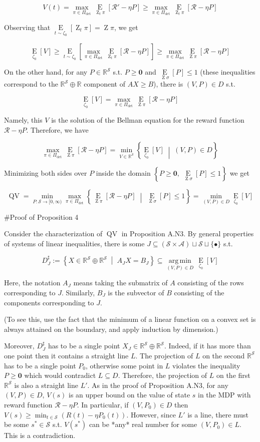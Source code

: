 \documentclass[a4paper]{article}
\newcommand{\AP}[1]{\left(#1\right)}
\newcommand{\AB}[1]{\left[#1\right]}
\newcommand{\AC}[1]{\left\{#1\right\}}
\newcommand{\ACM}[2]{\left\{#1\;\middle\vert\;#2\right\}}
\newcommand{\Ea}[2]{\underset{#1}{\operatorname{E}}\AB{#2}}
\newcommand{\Argmin}[1]{\underset{#1}{\operatorname{arg\,min}}\,}
\newcommand{\Reals}{\mathbb{R}}
\newcommand{\A}{\mathcal{A}}
\newcommand{\St}{\mathcal{S}}
\newcommand{\R}{\mathcal{R}}
\newcommand{\Pe}{P}
\newcommand{\QV}{\operatorname{QV}}
\DeclareMathOperator{\Z}{Z}
\begin{document}
$$V(t) = \max_{\pi\in\Pi_{\det}}{\Ea{\Z_t\pi}{\R'-\eta P}} \geq \max_{\pi\in\Pi_{\det}}{\Ea{\Z_t\pi}{\R-\eta P}}$$

Observing that $\Ea{t\sim\zeta_0}{\Z_t\pi} = \Z\pi$, we get

$$\Ea{\zeta_0}{V} \geq \Ea{t\sim\zeta_0}{\max_{\pi\in\Pi_{\det}}{\Ea{\Z_t\pi}{\R-\eta P}}} \geq \max_{\pi\in\Pi_{\det}} \Ea{\Z\pi}{\R - \eta P}$$

On the other hand, for any $P\in\Reals^\St$ s.t. $P\geq\boldsymbol{0}$ and $\Ea{\Z\sigma}{P} \leq 1$ (these inequalities correspond to the $\Reals^\St\oplus\Reals$ component of $AX \geq B$), there is $(V,P)\in D$ s.t.

$$\Ea{\zeta_0}{V} = \max_{\pi\in\Pi_{\det}} \Ea{\Z\pi}{\R - \eta P}$$

Namely, this $V$ is the solution of the Bellman equation for the reward function $\R-\eta P$. Therefore, we have

$$\max_{\pi\in\Pi_{\det}} \Ea{\Z\pi}{\R - \eta P} = \min_{V\in\Reals^\St}\ACM{\Ea{\zeta_0}{V}}{(V,P)\in D}$$

Minimizing both sides over $P$ inside the domain $\AC{P\geq\boldsymbol{0},\ \Ea{\Z\sigma}{P} \leq 1}$ we get

$$\QV = \min_{\Pe:\St\rightarrow[0,\infty)}\max_{\pi \in \Pi_{\det}}\ACM{\Ea{\Z\pi}{\R-\eta\Pe}}{\Ea{\Z\sigma}{\Pe}\leq1} = \min_{(V,P) \in D}{\Ea{\zeta_0}{V}}$$

\#Proof of Proposition 4

Consider the characterization of $\QV$ in Proposition A.N3. By general properties of systems of linear inequalities, there is some $J \subseteq (\St \times \A) \sqcup \St \sqcup \{\bullet\}$ s.t.

$$D^\sharp_J := \ACM{X \in \Reals^\St \oplus \Reals^\St}{A_J X = B_J} \subseteq \Argmin{(V,P) \in D}{\Ea{\zeta_0}{V}}$$

Here, the notation $A_J$ means taking the submatrix of $A$ consisting of the rows corresponding to $J$. Similarly, $B_J$ is the subvector of $B$ consisting of the components corresponding to $J$.

(To see this, use the fact that the minimum of a linear function on a convex set is always attained on the boundary, and apply induction by dimension.)

Moreover, $D_J^\sharp$ has to be a single point $X_J \in \Reals^\St \oplus \Reals^\St$. Indeed, if it has more than one point then it contains a straight line $L$. The projection of $L$ on the second $\Reals^\St$ has to be a single point $P_0$, otherwise some point in $L$ violates the inequality $P \geq \boldsymbol{0}$ which would contradict $L \subseteq D$. Therefore, the projection of $L$ on the first $\Reals^\St$ is also a straight line $L'$. As in the proof of Proposition A.N3, for any $(V,P) \in D$, $V(s)$ is an upper bound on the value of state $s$ in the MDP with reward function $\R-\eta P$. In particular, if $\AP{V,P_0} \in D$ then $V(s) \geq \min_{t\in\St} \AP{R(t)-\eta P_0(t)}$. However, since $L'$ is a line, there must be some $s^*\in\St$ s.t. $V\AP{s^*}$ can be *any* real number for some $\AP{V,P_0} \in L$. This is a contradiction.
\end{document}

